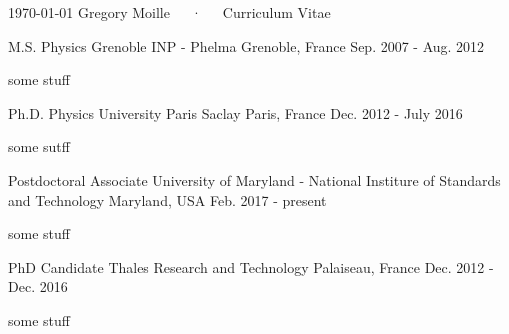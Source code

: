 \documentclass[11pt, letterpaper]{awesome-cv}
\begin{document}
\makecvheader

\makecvfooter
  {\today}
  {Gregory Moille~~~·~~~Curriculum Vitae}
  {\thepage}



\begin{cventries}%
%
\cventry%
    {M.S. Physics} %
    {Grenoble INP - Phelma } %
    {Grenoble, France} %
    {Sep. 2007 - Aug. 2012} %
    {
      \begin{cvitems} %
        \item {some stuff}
      \end{cvitems}
    }
\cventry%
    {Ph.D. Physics} %
    {University Paris Saclay} %
    {Paris, France} %
    {Dec. 2012 - July 2016} %
    {
      \begin{cvitems} %
        \item {some sutff}
      \end{cvitems}
    }
\end{cventries}


\begin{cventries}%
%
\cventry
    {Postdoctoral Associate} %
    {University of Maryland - National Institure of Standards and Technology} %
    {Maryland, USA} %
    {Feb. 2017 - present} %
    {
      \begin{cvitems} %
        \item {some stuff}
      \end{cvitems}
    }
\cventry
    {PhD Candidate} %
    {Thales Research and Technology} %
    {Palaiseau, France} %
    {Dec. 2012 - Dec. 2016} %
    {
      \begin{cvitems} %
        \item {some stuff}
      \end{cvitems}
    }
\end{cventries}
\end{document}
